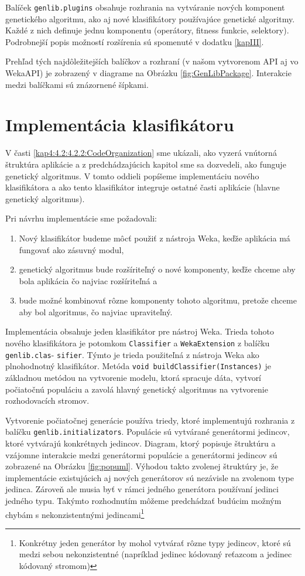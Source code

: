 Balíček \verb|genlib.plugins| obsahuje rozhrania na vytváranie nových komponent genetického algoritmu, ako aj nové klasifikátory používajúce genetické algoritmy. Každé z nich definuje jednu komponentu (operátory, fitness funkcie, selektory). Podrobnejší popis možností rozšírenia sú spomenuté v dodatku \ref{kapIII}.

Prehľad tých najdôležitejších balíčkov a rozhraní (v našom vytvorenom API aj vo WekaAPI) je zobrazený v diagrame na Obrázku \ref{fig:GenLibPackage}. Interakcie medzi balíčkami sú znázornené šípkami.
\section{Implementácia klasifikátoru}\label{kap4:4.3:Implementation}
V časti \ref{kap4:4.2:4.2.2:CodeOrganization} sme ukázali, ako vyzerá vnútorná štruktúra aplikácie a z predchádzajúcich kapitol sme sa dozvedeli, ako funguje genetický algoritmus. V tomto oddieli popíšeme implementáciu nového klasifikátora a ako tento klasifikátor integruje ostatné časti aplikácie (hlavne genetický algoritmus).

Pri návrhu implementácie sme požadovali:
\begin{enumerate}
\item Nový klasifikátor budeme môcť použiť z nástroja Weka, keďže aplikácia má fungovať ako zásuvný modul,
\item genetický algoritmus bude rozšíriteľný o nové komponenty, keďže chceme aby bola aplikácia čo najviac rozšíriteľná a
\item bude možné kombinovať rôzne komponenty tohoto algoritmu, pretože chceme aby bol algoritmus, čo najviac upraviteľný.
\end{enumerate}

Implementácia obsahuje jeden klasifikátor pre nástroj Weka. Trieda tohoto nového klasifikátora je potomkom \verb|Classifier| a \verb|WekaExtension| z balíčku \verb|genlib.clas|- \verb|sifier|. Týmto je trieda použiteľná z nástroja Weka ako plnohodnotný klasifikátor. Metóda \verb|void buildClassifier(Instances)| je základnou metódou na vytvorenie modelu, ktorá spracuje dáta, vytvorí počiatočnú populáciu a zavolá hlavný genetický algoritmus na vytvorenie rozhodovacích stromov. 

Vytvorenie počiatočnej generácie používa triedy, ktoré implementujú rozhrania z balíčku \verb|genlib.initializators|. Populácie sú vytvárané generátormi jedincov, ktoré vytvárajú konkrétnych jedincov. Diagram, ktorý popisuje štruktúru a vzájomne interakcie medzi generátormi populácie a generátormi jedincov sú zobrazené na Obrázku \ref{fig:popuml}. Výhodou takto zvolenej štruktúry je, že implementácie existujúcich aj nových generátorov sú nezávisle na zvolenom type jedinca. Zároveň ale musia byť v rámci jedného generátora používaní jedinci jedného typu. Takýmto rozhodnutím môžeme predchádzať budúcim možným chybám s nekonzistentnými jedincami\footnote{Konkrétny jeden generátor by mohol vytvárať rôzne typy jedincov, ktoré sú medzi sebou nekonzistentné (napríklad jedinec kódovaný reťazcom a jedinec kódovaný stromom)}

